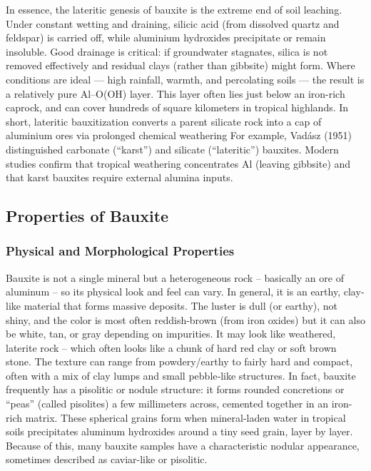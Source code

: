 \documentclass[12pt,a4paper, top=1.9cm, bottom=2.03cm, left=3.81cm, right=1.9cm]{article}
\begin{document}
\noindent\fontsize{12}{14}\selectfont In essence, the lateritic genesis of bauxite is the extreme end of soil leaching. Under constant wetting and draining, silicic acid (from dissolved quartz and feldspar) is carried off, while aluminium hydroxides precipitate or remain insoluble. Good drainage is critical: if groundwater stagnates, silica is not removed effectively and residual clays (rather than gibbsite) might form. Where conditions are ideal — high rainfall, warmth, and percolating soils — the result is a relatively pure Al–O(OH) layer. This layer often lies just below an iron-rich caprock, and can cover hundreds of square kilometers in tropical highlands. In short, lateritic bauxitization converts a parent silicate rock into a cap of aluminium ores via prolonged chemical weathering
\noindent\fontsize{12}{14}\selectfont For example, Vadász (1951) distinguished carbonate (“karst”) and silicate (“lateritic”) bauxites. Modern studies confirm that tropical weathering concentrates Al (leaving gibbsite) and that karst bauxites require external alumina inputs. 
\subsection{Properties of Bauxite}
\subsubsection{Physical and Morphological Properties}
\noindent\fontsize{12}{14}\selectfont Bauxite is not a single mineral but a heterogeneous rock – basically an ore of aluminum – so its physical look and feel can vary. In general, it is an earthy, clay‐like material that forms massive deposits. The luster is dull (or earthy), not shiny, and the color is most often reddish-brown (from iron oxides) but it can also be white, tan, or gray depending on impurities. It may look like weathered, laterite rock – which often looks like a chunk of hard red clay or soft brown stone. The texture can range from powdery/earthy to fairly hard and compact, often with a mix of clay lumps and small pebble‐like structures. In fact, bauxite frequently has a pisolitic or nodule structure: it forms rounded concretions or “peas” (called pisolites) a few millimeters across, cemented together in an iron-rich matrix. These spherical grains form when mineral-laden water in tropical soils precipitates aluminum hydroxides around a tiny seed grain, layer by layer. Because of this, many bauxite samples have a characteristic nodular appearance, sometimes described as caviar-like or pisolitic.
\end{document}
